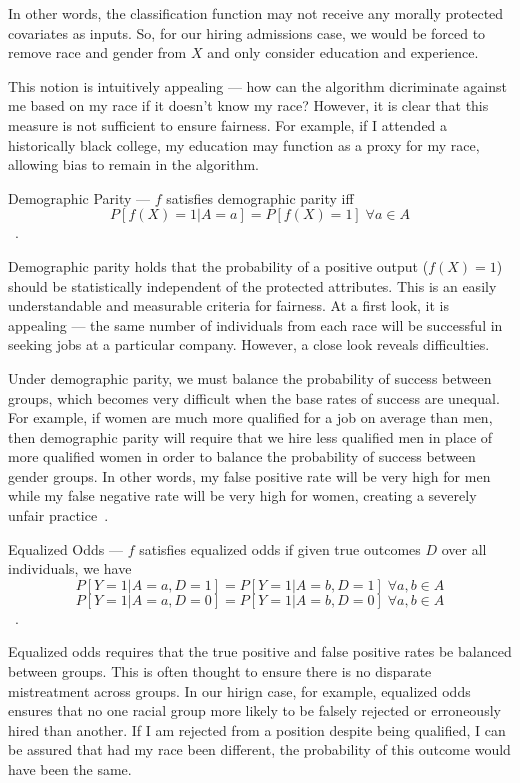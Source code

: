 In other words, the classification function may not receive any morally
protected covariates as inputs. So, for our hiring admissions case, we would be
forced to remove race and gender from $X$ and only consider education and
experience.

This notion is intuitively appealing — how can the algorithm dicriminate against
me based on my race if it doesn't know my race? However, it is clear that this
measure is not sufficient to ensure fairness. For example, if I attended a
historically black college, my education may function as a proxy for my race, 
allowing bias to remain in the algorithm.

\begin{definition}
    Demographic Parity — $f$ satisfies demographic parity iff
    \[P[f(X) = 1 | A = a] = P[f(X) = 1]\;\forall a \in A\]~\cite{Dwork_2012}.
\end{definition}

Demographic parity holds that the probability of a positive output ($f(X) = 1$)
should be statistically independent of the protected attributes. This is 
an easily understandable and measurable criteria for fairness. At a first look,
it is appealing — the same number of individuals from each race will be
successful in seeking jobs at a particular company. However, a close look
reveals difficulties.

Under demographic parity, we must balance the probability of success between
groups, which becomes very difficult when the base rates of success are
unequal. For example, if women are much more qualified for a job on average than
men, then demographic parity will require that we hire less qualified men in
place of more qualified women in order to balance the probability of success
between gender groups. In other words, my false positive rate will be very high
for men while my false negative rate will be very high for women, creating a 
severely unfair practice~\cite{Barocas_2017}.

\begin{definition}
    Equalized Odds — $f$ satisfies equalized odds if given true outcomes $D$
    over all individuals, we have
    \[P[Y=1|A=a, D=1] = P[Y=1|A=b, D=1]\;\forall a, b\in A\]
    \[P[Y=1|A=a, D=0] = P[Y=1|A=b, D=0]\;\forall a, b\in A\]~\cite{Hardt_2016}.
\end{definition}

Equalized odds requires that the true positive and false positive rates be
balanced between groups. This is often thought to ensure there is no disparate 
mistreatment across groups. In our hirign case, for example, equalized odds
ensures that no one racial group more likely to be falsely rejected or
erroneously hired than another. If I am rejected from a position despite being
qualified, I can be assured that had my race been different, the probability of
this outcome would have been the same. 

